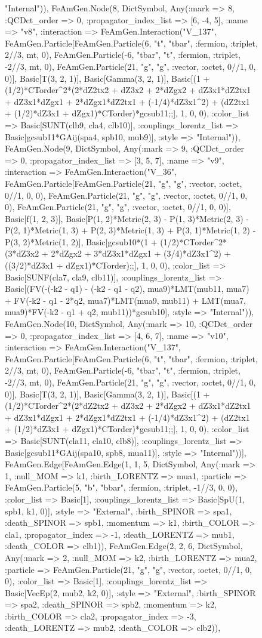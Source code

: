 \documentclass{revtex4}
\begin{document}
\begin{figure}[!htb]
\begin{center}
{"Internal")), FeAmGen.Node(8, Dict{Symbol, Any}(:mark => 8, :QCDct_order => 0, :propagator_index_list => [6, -4, 5], :name => "v8", :interaction => FeAmGen.Interaction("V_137", FeAmGen.Particle[FeAmGen.Particle(6, "t", "tbar", :fermion, :triplet, 2//3, mt, 0), FeAmGen.Particle(-6, "tbar", "t", :fermion, :triplet, -2//3, mt, 0), FeAmGen.Particle(21, "g", "g", :vector, :octet, 0//1, 0, 0)], Basic[T(3, 2, 1)], Basic[Gamma(3, 2, 1)], Basic[(1 + (1/2)*CTorder^2*(2*dZ2tx2 + dZ3x2 + 2*dZgx2 + dZ3x1*dZ2tx1 + dZ3x1*dZgx1 + 2*dZgx1*dZ2tx1 + (-1/4)*dZ3x1^2) + (dZ2tx1 + (1/2)*dZ3x1 + dZgx1)*CTorder)*gcsub11;;], 1, 0, 0), :color_list => Basic[SUNT(clb9, cla4, clb10)], :couplings_lorentz_list => Basic[gcsub11*GAij(spa4, spb10, mub9)], :style => "Internal")), FeAmGen.Node(9, Dict{Symbol, Any}(:mark => 9, :QCDct_order => 0, :propagator_index_list => [3, 5, 7], :name => "v9", :interaction => FeAmGen.Interaction("V_36", FeAmGen.Particle[FeAmGen.Particle(21, "g", "g", :vector, :octet, 0//1, 0, 0), FeAmGen.Particle(21, "g", "g", :vector, :octet, 0//1, 0, 0), FeAmGen.Particle(21, "g", "g", :vector, :octet, 0//1, 0, 0)], Basic[f(1, 2, 3)], Basic[P(1, 2)*Metric(2, 3) - P(1, 3)*Metric(2, 3) - P(2, 1)*Metric(1, 3) + P(2, 3)*Metric(1, 3) + P(3, 1)*Metric(1, 2) - P(3, 2)*Metric(1, 2)], Basic[gcsub10*(1 + (1/2)*CTorder^2*(3*dZ3x2 + 2*dZgx2 + 3*dZ3x1*dZgx1 + (3/4)*dZ3x1^2) + ((3/2)*dZ3x1 + dZgx1)*CTorder);;], 1, 0, 0), :color_list => Basic[SUNF(cla7, cla9, clb11)], :couplings_lorentz_list => Basic[(FV(-(-k2 - q1) - (-k2 - q1 - q2), mua9)*LMT(mub11, mua7) + FV(-k2 - q1 - 2*q2, mua7)*LMT(mua9, mub11) + LMT(mua7, mua9)*FV(-k2 - q1 + q2, mub11))*gcsub10], :style => "Internal")), FeAmGen.Node(10, Dict{Symbol, Any}(:mark => 10, :QCDct_order => 0, :propagator_index_list => [4, 6, 7], :name => "v10", :interaction => FeAmGen.Interaction("V_137", FeAmGen.Particle[FeAmGen.Particle(6, "t", "tbar", :fermion, :triplet, 2//3, mt, 0), FeAmGen.Particle(-6, "tbar", "t", :fermion, :triplet, -2//3, mt, 0), FeAmGen.Particle(21, "g", "g", :vector, :octet, 0//1, 0, 0)], Basic[T(3, 2, 1)], Basic[Gamma(3, 2, 1)], Basic[(1 + (1/2)*CTorder^2*(2*dZ2tx2 + dZ3x2 + 2*dZgx2 + dZ3x1*dZ2tx1 + dZ3x1*dZgx1 + 2*dZgx1*dZ2tx1 + (-1/4)*dZ3x1^2) + (dZ2tx1 + (1/2)*dZ3x1 + dZgx1)*CTorder)*gcsub11;;], 1, 0, 0), :color_list => Basic[SUNT(cla11, cla10, clb8)], :couplings_lorentz_list => Basic[gcsub11*GAij(spa10, spb8, mua11)], :style => "Internal"))], FeAmGen.Edge[FeAmGen.Edge(1, 1, 5, Dict{Symbol, Any}(:mark => 1, :null_MOM => k1, :birth_LORENTZ => mua1, :particle => FeAmGen.Particle(5, "b", "bbar", :fermion, :triplet, -1//3, 0, 0), :color_list => Basic[1], :couplings_lorentz_list => Basic[SpU(1, spb1, k1, 0)], :style => "External", :birth_SPINOR => spa1, :death_SPINOR => spb1, :momentum => k1, :birth_COLOR => cla1, :propagator_index => -1, :death_LORENTZ => mub1, :death_COLOR => clb1)), FeAmGen.Edge(2, 2, 6, Dict{Symbol, Any}(:mark => 2, :null_MOM => k2, :birth_LORENTZ => mua2, :particle => FeAmGen.Particle(21, "g", "g", :vector, :octet, 0//1, 0, 0), :color_list => Basic[1], :couplings_lorentz_list => Basic[VecEp(2, mub2, k2, 0)], :style => "External", :birth_SPINOR => spa2, :death_SPINOR => spb2, :momentum => k2, :birth_COLOR => cla2, :propagator_index => -3, :death_LORENTZ => mub2, :death_COLOR => clb2)), }
\end{center}
\end{figure}
\end{document}
